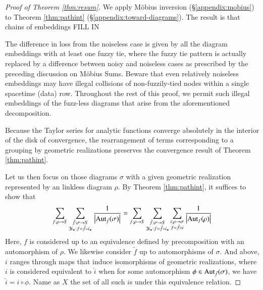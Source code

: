 \documentclass[anon,12pt]{colt2021} %
\newcommand{\wabs}[1]{\left|#1\right|}
\newcommand{\Aut}{\text{\textnormal{Aut}}}
\begin{document}
        \begin{proof}[Proof of Theorem \ref{thm:resum}]
            We apply M\"obius inversion (\S\ref{appendix:mobius}) to Theorem
            \ref{thm:pathint} (\S\ref{appendix:toward-diagrams}).  The result
            is that chains of embeddings  
            {\color{red} FILL IN}

            The difference in loss from the noiseless case is given by all the
            diagram embeddings with at least one fuzzy tie, where the fuzzy tie
            pattern is actually replaced by a difference between noisy and
            noiseless cases as prescribed by the preceding discussion on
            M\"obius Sums.  Beware that even relatively noiseless embeddings
            may have illegal collisions of non-fuzzily-tied nodes within a
            single spacetime (data) row.  Throughout the rest of this proof, we
            permit such illegal embeddings of the fuzz-less diagrams that arise
            from the aforementioned decomposition.  

            Because the Taylor series for analytic functions converge
            absolutely in the interior of the disk of convergence, the
            rearrangement of terms corresponding to a grouping by geometric
            realizations preserves the convergence result of Theorem
            \ref{thm:pathint}.  

            Let us then focus on those diagrams $\sigma$ with a given geometric
            realization represented by an linkless diagram $\rho$.  By
            Theorem \ref{thm:pathint}, it suffices to show that
            \begin{equation} \label{eq:hard}
                \sum_{f:\rho\to S}
                \sum_{\substack{
                    \tilde f:\sigma\to S \\
                    \exists i_\star: f=\tilde f \circ i_\star
                }}
                \frac{1}{\wabs{\Aut_{\tilde f}(\sigma)}}
                =
                \sum_{f:\rho\to S}
                \sum_{\substack{
                    \tilde f:\sigma\to S \\
                    \exists i_\star: f=\tilde f \circ i_\star
                }}
                \sum_{\substack{
                    i:\rho\to\sigma \\
                    f = \tilde f \circ i
                }}
                \frac{1}{\wabs{\Aut_{f}(\rho)}}
            \end{equation}
            Here, $f$ is considered up to an equivalence defined by
            precomposition with an automorphism of $\rho$.  We likewise
            consider $\tilde f$ up to automorphisms of $\sigma$.  And above,
            $i$ ranges through maps that induce isomorphisms of geometric
            realizations, where $i$ is considered equivalent to $\hat i$ when
            for some automorphism $\phi \in \Aut_{\tilde f}(\sigma)$, we have
            $\hat i = i \circ \phi$.  Name as $X$ the set of all such $i$s
            under this equivalence relation.


\end{proof}
\end{document}
